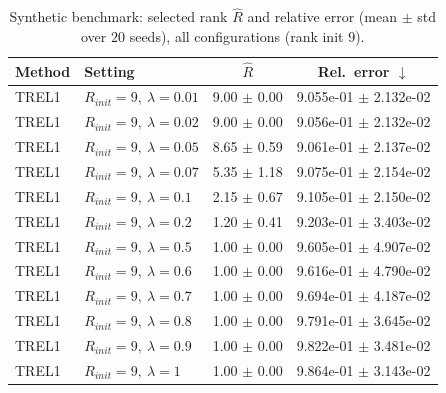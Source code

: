\begin{table}[t]
\centering
\caption{Synthetic benchmark: selected rank \(\hat R\) and relative error (mean \(\pm\) std over \(20\) seeds), all configurations (rank init 9).}
\label{tab:results_synth_all}
\begin{tabular}{@{}llcc@{}}
\toprule
Method & Setting & \(\hat R\) & Rel.\ error \(\downarrow\) \\ \midrule
TREL1 & \(R_{init}=9,\ \lambda=0.01\) & 9.00 $\pm$ 0.00 & 9.055e-01 $\pm$ 2.132e-02 \\
TREL1 & \(R_{init}=9,\ \lambda=0.02\) & 9.00 $\pm$ 0.00 & 9.056e-01 $\pm$ 2.132e-02 \\
TREL1 & \(R_{init}=9,\ \lambda=0.05\) & 8.65 $\pm$ 0.59 & 9.061e-01 $\pm$ 2.137e-02 \\
TREL1 & \(R_{init}=9,\ \lambda=0.07\) & 5.35 $\pm$ 1.18 & 9.075e-01 $\pm$ 2.154e-02 \\
TREL1 & \(R_{init}=9,\ \lambda=0.1\) & 2.15 $\pm$ 0.67 & 9.105e-01 $\pm$ 2.150e-02 \\
TREL1 & \(R_{init}=9,\ \lambda=0.2\) & 1.20 $\pm$ 0.41 & 9.203e-01 $\pm$ 3.403e-02 \\
TREL1 & \(R_{init}=9,\ \lambda=0.5\) & 1.00 $\pm$ 0.00 & 9.605e-01 $\pm$ 4.907e-02 \\
TREL1 & \(R_{init}=9,\ \lambda=0.6\) & 1.00 $\pm$ 0.00 & 9.616e-01 $\pm$ 4.790e-02 \\
TREL1 & \(R_{init}=9,\ \lambda=0.7\) & 1.00 $\pm$ 0.00 & 9.694e-01 $\pm$ 4.187e-02 \\
TREL1 & \(R_{init}=9,\ \lambda=0.8\) & 1.00 $\pm$ 0.00 & 9.791e-01 $\pm$ 3.645e-02 \\
TREL1 & \(R_{init}=9,\ \lambda=0.9\) & 1.00 $\pm$ 0.00 & 9.822e-01 $\pm$ 3.481e-02 \\
TREL1 & \(R_{init}=9,\ \lambda=1\) & 1.00 $\pm$ 0.00 & 9.864e-01 $\pm$ 3.143e-02 \\
\bottomrule
\end{tabular}
\end{table}